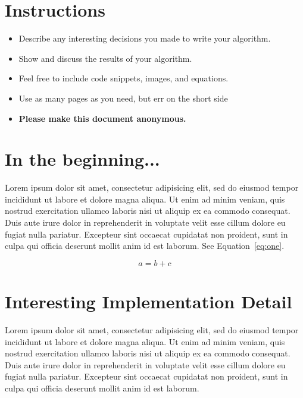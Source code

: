 \lstset{style=mystyle, language=python, frame=single}


\maketitle
\vspace{-3cm}
\thispagestyle{fancy}

\section*{Instructions}
\begin{itemize}
  \item Describe any interesting decisions you made to write your algorithm.
  \item Show and discuss the results of your algorithm.
  \item Feel free to include code snippets, images, and equations.
  \item Use as many pages as you need, but err on the short side
  \item \textbf{Please make this document anonymous.}
\end{itemize}

\section*{In the beginning...}

Lorem ipsum dolor sit amet, consectetur adipisicing elit, sed do eiusmod tempor incididunt ut labore et dolore magna aliqua. Ut enim ad minim veniam, quis nostrud exercitation ullamco laboris nisi ut aliquip ex ea commodo consequat. Duis aute irure dolor in reprehenderit in voluptate velit esse cillum dolore eu fugiat nulla pariatur. Excepteur sint occaecat cupidatat non proident, sunt in culpa qui officia deserunt mollit anim id est laborum. See Equation~\ref{eq:one}.

\begin{equation}
a = b + c
\label{eq:one}
\end{equation}

\section*{Interesting Implementation Detail}

Lorem ipsum dolor sit amet, consectetur adipisicing elit, sed do eiusmod tempor incididunt ut labore et dolore magna aliqua. Ut enim ad minim veniam, quis nostrud exercitation ullamco laboris nisi ut aliquip ex ea commodo consequat. Duis aute irure dolor in reprehenderit in voluptate velit esse cillum dolore eu fugiat nulla pariatur. Excepteur sint occaecat cupidatat non proident, sunt in culpa qui officia deserunt mollit anim id est laborum.


